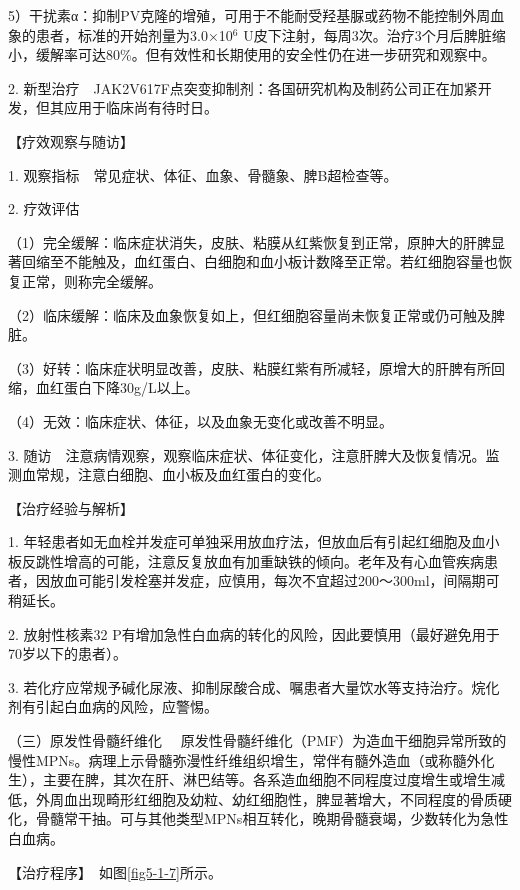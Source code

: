 5）干扰素α：抑制PV克隆的增殖，可用于不能耐受羟基脲或药物不能控制外周血象的患者，标准的开始剂量为3.0×10$^{6}$
U皮下注射，每周3次。治疗3个月后脾脏缩小，缓解率可达80\%。但有效性和长期使用的安全性仍在进一步研究和观察中。

2.
新型治疗　JAK2V617F点突变抑制剂：各国研究机构及制药公司正在加紧开发，但其应用于临床尚有待时日。

【疗效观察与随访】

1. 观察指标　常见症状、体征、血象、骨髓象、脾B超检查等。

2. 疗效评估

（1）完全缓解：临床症状消失，皮肤、粘膜从红紫恢复到正常，原肿大的肝脾显著回缩至不能触及，血红蛋白、白细胞和血小板计数降至正常。若红细胞容量也恢复正常，则称完全缓解。

（2）临床缓解：临床及血象恢复如上，但红细胞容量尚未恢复正常或仍可触及脾脏。

（3）好转：临床症状明显改善，皮肤、粘膜红紫有所减轻，原增大的肝脾有所回缩，血红蛋白下降30g/L以上。

（4）无效：临床症状、体征，以及血象无变化或改善不明显。

3.
随访　注意病情观察，观察临床症状、体征变化，注意肝脾大及恢复情况。监测血常规，注意白细胞、血小板及血红蛋白的变化。

【治疗经验与解析】

1.
年轻患者如无血栓并发症可单独采用放血疗法，但放血后有引起红细胞及血小板反跳性增高的可能，注意反复放血有加重缺铁的倾向。老年及有心血管疾病患者，因放血可能引发栓塞并发症，应慎用，每次不宜超过200～300ml，间隔期可稍延长。

2. 放射性核素{32}
P有增加急性白血病的转化的风险，因此要慎用（最好避免用于70岁以下的患者）。

3.
若化疗应常规予碱化尿液、抑制尿酸合成、嘱患者大量饮水等支持治疗。烷化剂有引起白血病的风险，应警惕。

{（三）原发性骨髓纤维化}
　原发性骨髓纤维化（PMF）为造血干细胞异常所致的慢性MPNs。病理上示骨髓弥漫性纤维组织增生，常伴有髓外造血（或称髓外化生），主要在脾，其次在肝、淋巴结等。各系造血细胞不同程度过度增生或增生减低，外周血出现畸形红细胞及幼粒、幼红细胞性，脾显著增大，不同程度的骨质硬化，骨髓常干抽。可与其他类型MPNs相互转化，晚期骨髓衰竭，少数转化为急性白血病。

【治疗程序】　如图\ref{fig5-1-7}所示。

